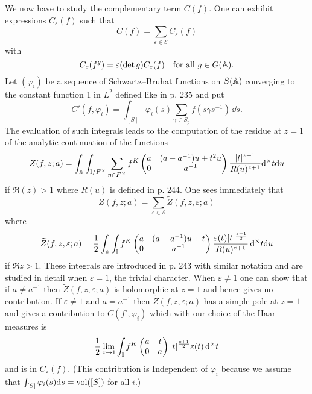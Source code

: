 We now have to study the complementary term $C(f)$.
One can exhibit expressions $C_\varepsilon(f)$ such that
\[
C(f) = \sum_{\varepsilon \in \mathscr{E}} C_\varepsilon(f)
\]
with
\[
C_\varepsilon(f^g) = \varepsilon(\det g) C_\varepsilon(f)\quad \text{for all } g \in G(\mathbb{A}).
\]
Let $(\varphi_i)$ be a sequence of Schwartz--Bruhat functions on $S(\mathbb{A})$ converging to the constant function 1 in $L^2$ defined like in \cite{duflo1971formule} p. 235 and put
\[
C'(f, \varphi_i) = \int_{[S]} \varphi_i(s)\sum_{\gamma \in S_p} f(s \gamma s^{-1}) \, \dd s.
\]
The evaluation of such integrals leads to the computation of the residue at $z = 1$ of the analytic continuation of the functions
\[
Z(f, z;a) = \int_{\mathbb{A}} \int_{\mathbb{I} / F^\times} \sum_{\eta \in F^\times} f^K\begin{pmatrix}
    a & (a - a^{-1})u + t^2 u \\ 0 & a^{-1}
\end{pmatrix} \frac{|t|^{z + 1}}{R(u)^{z + 1}} \mathrm{d}^\times t \mathrm{d} u
\]
if $\Re(z) > 1$ where $R(u)$ is defined in \cite{duflo1971formule} p. 244.
One sees immediately that
\[
Z(f, z; a) = \sum_{\varepsilon \in \mathscr{E}} \widetilde{Z}(f, z, \varepsilon; a)
\]
where
\[
\widetilde{Z}(f, z, \varepsilon; a) = \frac{1}{2} \int_{\mathbb{A}} \int_{\mathbb{I}} f^K\begin{pmatrix}
    a & (a - a^{-1})u + t \\ 0 & a^{-1}
\end{pmatrix} \frac{\varepsilon(t) |t|^{\frac{z + 1}{2}}}{R(u)^{z + 1}} \, \mathrm{d}^\times t \mathrm{d} u
\]
if $\Re z > 1$.
These integrals are introduced in \cite{duflo1971formule} p. 243 with similar notation and are studied in detail when $\varepsilon = 1$, the trivial character.
When $\varepsilon \ne 1$ one can show that if $a \ne a^{-1}$ then $\widetilde{Z}(f, z, \varepsilon; a)$ is holomorphic at $z = 1$ and hence gives no contribution.
If $\varepsilon \ne 1$ and $a = a^{-1}$ then $\widetilde{Z}(f, z, \varepsilon; a)$ has a simple pole at $z = 1$ and gives a contribution to $C(f', \varphi_i)$ which with our choice of the Haar measures is
\[
\frac{1}{2}\lim_{z \to 1} \int_{\mathbb{I}} f^K \begin{pmatrix}
    a & t \\ 0 & a
\end{pmatrix} |t|^{\frac{z + 1}{2}} \varepsilon(t) \, \mathrm{d}^\times t
\]
and is in $C_\varepsilon(f)$.
(This contribution is Independent of $\varphi_i$ because we assume that $\int_{[S]} \varphi_i(s) \mathrm{d} s = \mathrm{vol}([S])$ for all $i$.)

